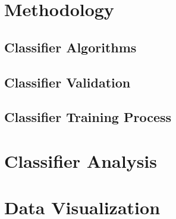 \begin{comment}



\end{comment}

\section{Methodology}

\subsection{Classifier Algorithms}

\subsection{Classifier Validation}

\subsection{Classifier Training Process}

\section{Classifier Analysis}

\section{Data Visualization}
